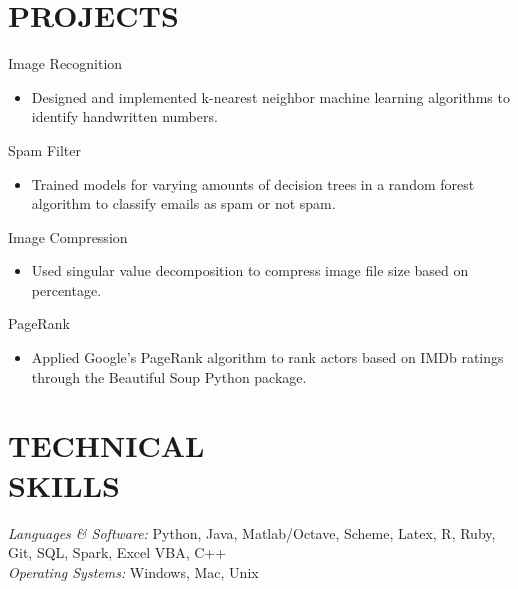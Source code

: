 \documentclass[margin, 8pt]{res} %
\begin{document}
\begin{resume}

\section{PROJECTS}Image Recognition
		\begin{itemize} \itemsep -2pt
		\item Designed and implemented k-nearest neighbor machine learning algorithms to identify handwritten numbers.
		\end{itemize}
		Spam Filter
		\begin{itemize} \itemsep -2pt
		\item Trained models for varying amounts of decision trees in a random forest algorithm to classify emails as spam or not spam.
		\end{itemize}
		Image Compression
		\begin{itemize} \itemsep -2pt
		\item Used singular value decomposition to compress image file size based on percentage.
		\end{itemize}
		PageRank
		\begin{itemize} \itemsep -2pt
		\item Applied Google's PageRank algorithm to rank actors based on IMDb ratings through the Beautiful Soup Python package.
		\end{itemize}

\section{TECHNICAL \\ SKILLS} {\sl Languages \& Software:} Python, Java, Matlab/Octave, 
         Scheme, Latex, R, Ruby, Git, SQL, Spark, Excel VBA, C++\\
                {\sl Operating Systems:} Windows, Mac, Unix\\
								

\end{resume}
\end{document}
